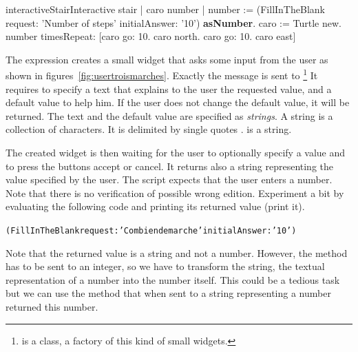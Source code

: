 \begin{scriptfig}{interactiveStair}{Interactive stair}\label{scr:interactive}
| caro number | 
number := (FillInTheBlank 
            request: 'Number of steps' 
            initialAnswer: '10') \textbf{asNumber}. 
caro := Turtle new.
number timesRepeat:  
   [caro go: 10.
   caro north.
   caro go: 10.
   caro east]
\end{scriptfig}


The expression    creates a small
widget that asks some input from the user as shown in figures~\ref{fig:usertroismarches}. Exactly the message
 is sent to \footnote{ is a class, \ie a factory of this kind of small widgets.} It requires to specify a text that explains to the user the requested value, and a default value to help him. If the user does not change the default value, it will be returned. The text and the default value are specified as \textit{strings}. A string is a collection of characters. It is delimited by single quotes .   is a string. 

The created widget is then waiting for the user to optionally specify a value and to press the buttons accept or cancel. 
It returns also a string representing the value specified by the user. The script expects that the user enters a number. Note that there is no verification of possible wrong edition. Experiment a bit by evaluating the following code and printing its returned value (print it). 

\begin{alltt}
(FillInTheBlank request: 'Combien de marche' initialAnswer: '10')
\end{alltt}

Note that the returned value is a string and not a number. However, the method  has to be sent to an integer, so we have to transform the string, the textual representation of a number into the number itself. This could be a tedious task but we can use the method  that when sent to a string representing a number returned this number. 


